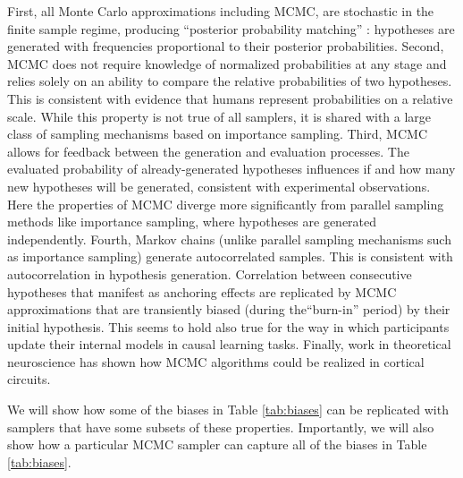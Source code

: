 First, all Monte Carlo approximations including MCMC, are stochastic in the finite sample regime, producing ``posterior probability matching'' \citep{wozny2010,Denison2013,Moreno11,Vul2014}: hypotheses are generated with frequencies proportional to their posterior probabilities. Second, MCMC does not require knowledge of normalized probabilities at any stage and relies solely on an ability to compare the relative probabilities of two hypotheses. This is consistent with evidence that humans represent probabilities on a relative scale.\citep{stewart06} While this property is not true of all samplers, it is shared with a large class of sampling mechanisms based on importance sampling. Third, MCMC allows for feedback between the generation and evaluation processes. The evaluated probability of already-generated hypotheses influences if and how many new hypotheses will be generated, consistent with experimental observations.\citep{hamrick2015think} Here the properties of MCMC diverge more significantly from parallel sampling methods like importance sampling, where hypotheses are generated independently. Fourth, Markov chains (unlike parallel sampling mechanisms such as importance sampling) generate autocorrelated samples. This is consistent with autocorrelation in hypothesis generation.\citep{multistability,vul08,Bonawitz2014} Correlation between consecutive hypotheses that manifest as anchoring effects \citep[where judgments are biased by the initial hypothesis;][]{tversky} are replicated by MCMC approximations that are transiently biased (during the``burn-in'' period) by their initial hypothesis. \citep{lieder2017anchoring,lieder2017empirical} This seems to hold also true for the way in which participants update their internal models in causal learning tasks. \citep{bramley2017formalizing} Finally, work in theoretical neuroscience has shown how MCMC algorithms could be realized in cortical circuits.\citep{buesing11,pecevski11,Moreno11}

We will show how some of the biases in Table \ref{tab:biases} can be replicated with samplers that have some  subsets of these properties. Importantly, we will also show how a particular MCMC sampler can capture all of the biases in Table \ref{tab:biases}.



